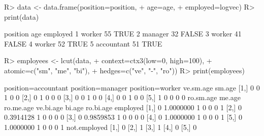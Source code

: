 \documentclass{article}\usepackage[]{graphicx}\usepackage[]{color}
\begin{document}
\begin{Schunk}
% --begin: "lcut.data.frame"
\begin{Sinput}
R> data <- data.frame(position=position,
+                     age=age,
+                     employed=logvec)
R> print(data)
\end{Sinput}
\begin{Soutput}
    position age employed
1     worker  55     TRUE
2    manager  32    FALSE
3     worker  41    FALSE
4     worker  52     TRUE
5 accountant  51     TRUE
\end{Soutput}
\begin{Sinput}
R> employees <- lcut(data,
+       context=ctx3(low=0, high=100),
+       atomic=c("sm", "me", "bi"),
+       hedges=c("ve", "-", "ro"))
R> print(employees)
\end{Sinput}
\begin{Soutput}
     position=accountant position=manager position=worker ve.sm.age sm.age
[1,]                   0                0               1         0      0
[2,]                   0                1               0         0      0
[3,]                   0                0               1         0      0
[4,]                   0                0               1         0      0
[5,]                   1                0               0         0      0
     ro.sm.age    me.age ro.me.age ve.bi.age bi.age ro.bi.age employed
[1,]         0 1.0000000         1         0      0         0        1
[2,]         0 0.3914128         1         0      0         0        0
[3,]         0 0.9859853         1         0      0         0        0
[4,]         0 1.0000000         1         0      0         0        1
[5,]         0 1.0000000         1         0      0         0        1
     not.employed
[1,]            0
[2,]            1
[3,]            1
[4,]            0
[5,]            0
\end{Soutput}
%
% --end: "lcut.data.frame"
\end{Schunk}
\end{document}

